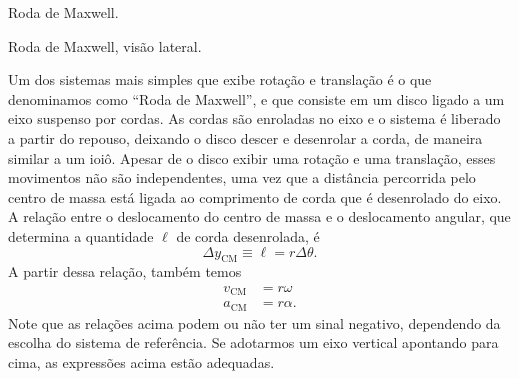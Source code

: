 \begin{marginfigure}[-1.5cm]
\begin{tikzpicture}[>=Stealth, rotate = -95,
     interface/.style={
        postaction={draw,decorate,decoration={border,angle=-45,
                    amplitude=0.2cm,segment length=2mm}}},
    ]
\end{tikzpicture}
\caption{Roda de Maxwell.\label{Fig:RodaDeMaxwell}}
\end{marginfigure}

\begin{marginfigure}[1.5cm]
\centering
{}
\caption{Roda de Maxwell, visão lateral.\label{Fig:RodaDeMaxwellVisaoLateral}}
\end{marginfigure}

Um dos sistemas mais simples que exibe rotação e translação é o que denominamos como ``Roda de Maxwell'', e que consiste em um disco ligado a um eixo suspenso por cordas. As cordas são enroladas no eixo e o sistema é liberado a partir do repouso, deixando o disco descer e desenrolar a corda, de maneira similar a um ioiô. Apesar de o disco exibir uma rotação e uma translação, esses movimentos não são independentes, uma vez que a distância percorrida pelo centro de massa está ligada ao comprimento de corda que é desenrolado do eixo. A relação entre o deslocamento do centro de massa e o deslocamento angular, que determina a quantidade $\ell$ de corda desenrolada, é
\begin{equation}
    \Delta y_{\text{CM}} \equiv \ell = r \Delta \theta.
\end{equation}
%
A partir dessa relação, também temos
\begin{align}
    v_{\text{CM}} &= r \omega \\
    a_{\text{CM}} &= r \alpha.
\end{align}
%
Note que as relações acima podem ou não ter um sinal negativo, dependendo da escolha do sistema de referência. Se adotarmos um eixo vertical apontando para cima, as expressões acima estão adequadas. %

